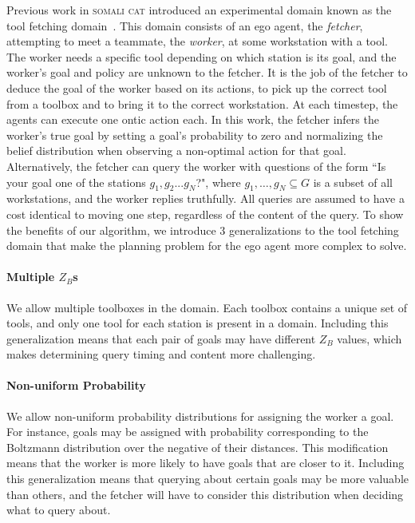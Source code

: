 \documentclass[letterpaper]{article}
\begin{document}
Previous work in \textsc{somali cat} introduced an experimental domain known as the tool fetching domain~\cite{mirskypenny}. This domain consists of an ego agent, the \emph{fetcher}, attempting to meet a teammate, the \emph{worker}, at some workstation with a tool. The worker needs a specific tool depending on which station is its goal, and the worker's goal and policy are unknown to the fetcher. It is the job of the fetcher to deduce the goal of the worker based on its actions, to pick up the correct tool from a toolbox and to bring it to the correct workstation. At each timestep, the agents can execute one ontic action each. In this work, the fetcher infers the worker's true goal by setting a goal's probability to zero and normalizing the belief distribution when observing a non-optimal action for that goal. Alternatively, the fetcher can query the worker with questions of the form ``Is your goal one of the stations $g_1,g_2...g_N$?", where $g_1, \ldots, g_N \subseteq G$ is a subset of all workstations, and the worker replies truthfully. All queries are assumed to have a cost identical to moving one step, regardless of the content of the query.
To show the benefits of our algorithm, we introduce 3 generalizations to the tool fetching domain that make the planning problem for the ego agent more complex to solve. 
    \paragraph{Multiple $Z_B$s} We allow multiple toolboxes in the domain. Each toolbox contains a unique set of tools, and only one tool for each station is present in a domain. Including this generalization means that each pair of goals may have different $Z_B$ values, which makes determining query timing and content more challenging. %
    \paragraph{Non-uniform Probability} We allow non-uniform probability distributions for assigning the worker a goal. For instance, goals may be assigned with probability corresponding to the Boltzmann distribution over the negative of their distances. This modification means that the worker is more likely to have goals that are closer to it. Including this generalization means that querying about certain goals may be more valuable than others, and the fetcher will have to consider this distribution when deciding what to query about.
\end{document}
